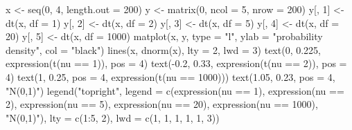 \begin{Schunk}
\begin{Sinput}
 x <- seq(0, 4, length.out = 200)
 y <- matrix(0, ncol = 5, nrow = 200)
 y[, 1] <- dt(x, df = 1)
 y[, 2] <- dt(x, df = 2)
 y[, 3] <- dt(x, df = 5)
 y[, 4] <- dt(x, df = 20)
 y[, 5] <- dt(x, df = 1000)
 matplot(x, y, type = "l", ylab = "probability density", col = "black")
 lines(x, dnorm(x), lty = 2, lwd = 3)
 text(0, 0.225, expression(t(nu == 1)), pos = 4)
 text(-0.2, 0.33, expression(t(nu == 2)), pos = 4)
 text(1, 0.25, pos = 4, expression(t(nu == 1000)))
 text(1.05, 0.23, pos = 4, "N(0,1)")
 legend("topright", legend = c(expression(nu == 1), expression(nu == 2), expression(nu == 
      5), expression(nu == 20), expression(nu == 1000), "N(0,1)"), lty = c(1:5, 
      2), lwd = c(1, 1, 1, 1, 1, 3))
\end{Sinput}
\end{Schunk}
